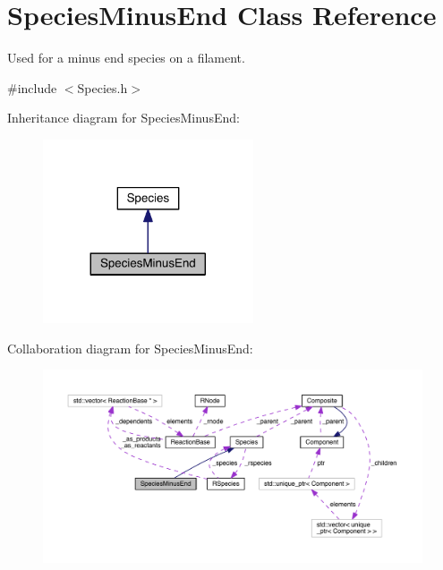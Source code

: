 \hypertarget{classSpeciesMinusEnd}{\section{Species\+Minus\+End Class Reference}
\label{classSpeciesMinusEnd}
}


Used for a minus end species on a filament.  




{\ttfamily \#include $<$Species.\+h$>$}



Inheritance diagram for Species\+Minus\+End\+:\nopagebreak
\begin{figure}[H]
\begin{center}
\leavevmode
\includegraphics[width=176pt]{classSpeciesMinusEnd__inherit__graph}
\end{center}
\end{figure}


Collaboration diagram for Species\+Minus\+End\+:\nopagebreak
\begin{figure}[H]
\begin{center}
\leavevmode
\includegraphics[width=350pt]{classSpeciesMinusEnd__coll__graph}
\end{center}
\end{figure}
